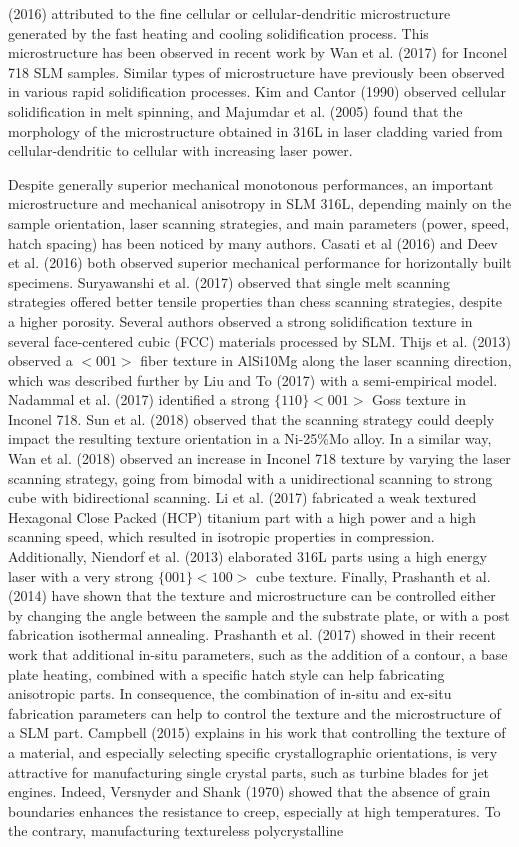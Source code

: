 \documentclass[10pt]{article}
\begin{document}
(2016) attributed to the fine cellular or cellular-dendritic microstructure generated by the fast heating and cooling solidification process. This microstructure has been observed in recent work by Wan et al. (2017) for Inconel 718 SLM samples. Similar types of microstructure have previously been observed in various rapid solidification processes. Kim and Cantor (1990) observed cellular solidification in melt spinning, and Majumdar et al. (2005) found that the morphology of the microstructure obtained in 316L in laser cladding varied from cellular-dendritic to cellular with increasing laser power.

Despite generally superior mechanical monotonous performances, an important microstructure and mechanical anisotropy in SLM 316L, depending mainly on the sample orientation, laser scanning strategies, and main parameters (power, speed, hatch spacing) has been noticed by many authors. Casati et al (2016) and Deev et al. (2016) both observed superior mechanical performance for horizontally built specimens. Suryawanshi et al. (2017) observed that single melt scanning strategies offered better tensile properties than chess scanning strategies, despite a higher porosity. Several authors observed a strong solidification texture in several face-centered cubic (FCC) materials processed by SLM. Thijs et al. (2013) observed a $<001>$ fiber texture in AlSi10Mg along the laser scanning direction, which was described further by Liu and To (2017) with a semi-empirical model. Nadammal et al. (2017) identified a strong $\{110\}<001>$ Goss texture in Inconel 718. Sun et al. (2018) observed that the scanning strategy could deeply impact the resulting texture orientation in a Ni-25\%Mo alloy. In a similar way, Wan et al. (2018) observed an increase in Inconel 718 texture by varying the laser scanning strategy, going from bimodal with a unidirectional scanning to strong cube with bidirectional scanning. Li et al. (2017) fabricated a weak textured Hexagonal Close Packed (HCP) titanium part with a high power and a high scanning speed, which resulted in isotropic properties in compression. Additionally, Niendorf et al. (2013) elaborated 316L parts using a high energy laser with a very strong $\{001\}<100>$ cube texture. Finally, Prashanth et al. (2014) have shown that the texture and microstructure can be controlled either by changing the angle between the sample and the substrate plate, or with a post fabrication isothermal annealing. Prashanth et al. (2017) showed in their recent work that additional in-situ parameters, such as the addition of a contour, a base plate heating, combined with a specific hatch style can help fabricating anisotropic parts. In consequence, the combination of in-situ and ex-situ fabrication parameters can help to control the texture and the microstructure of a SLM part. Campbell (2015) explains in his work that controlling the texture of a material, and especially selecting specific crystallographic orientations, is very attractive for manufacturing single crystal parts, such as turbine blades for jet engines. Indeed, Versnyder and Shank (1970) showed that the absence of grain boundaries enhances the resistance to creep, especially at high temperatures. To the contrary, manufacturing textureless polycrystalline 
\end{document}
